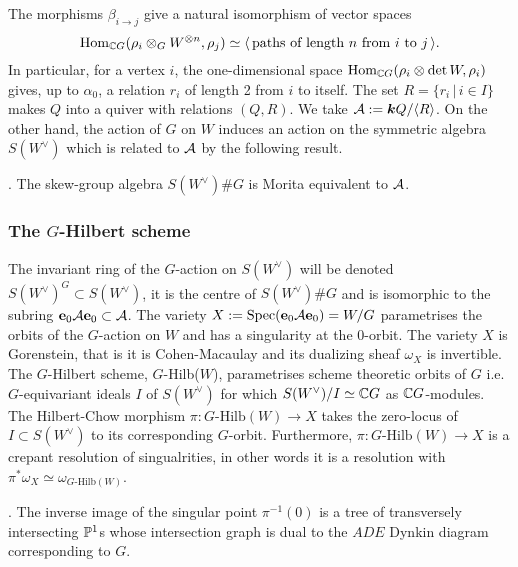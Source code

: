 \documentclass{amsart}
\theoremstyle{definition}
\newcommand\W{W}
\begin{document}

The morphisms $\beta_{i \rightarrow j}$ give a natural isomorphism of vector spaces $$\Hom_{\bC G}(\rho_i \otimes_G \W^{\otimes n}, \rho_j) \simeq \langle\, \text{paths of length }n \text{ from }i \text{ to } j\,\rangle.$$
In particular, for a vertex $i$, the one-dimensional space $\Hom_{\bC G} (\rho_i \otimes \det \W, \rho_i)$ gives, up to $\alpha_0$, a relation $r_i$ of length 2 from $i$ to itself.
The set $R = \{r_i \, |\, i \in I\}$ makes $Q$ into a quiver with relations $(Q, R)$. 
We take $\mathcal{A}:= {\boldsymbol{k}} Q/ \langle R\rangle$.
On the other hand, the action of $G$ on $\W$ induces an action on the symmetric algebra $S(W^\vee)$ which is related to $\mathcal{A}$ by the following result.

\begin{theorem}\cite{MR2593679}.
The skew-group algebra $S(W^\vee) \# G$ is Morita equivalent to $\mathcal{A}$.
\end{theorem}

\subsubsection{The $G$-Hilbert scheme}

The invariant ring of the $G$-action on $S(W^\vee)$ will be denoted $S(W^\vee)^G \subset S(W^\vee)$, it is the centre of $S(W^\vee) \# G$ and is isomorphic to the subring $\mathbf{e}_0 \mathcal{A} \mathbf{e}_0 \subset \mathcal{A}$.
The variety $X:= \Spec(\bfe_0 \cA \bfe_0)=\W/G$ parametrises the orbits of the $G$-action on $\W$ and has a singularity at the $0$-orbit.
The variety $X$ is Gorenstein, that is it is Cohen-Macaulay and its dualizing sheaf $\omega_X$ is invertible.
The $G$-Hilbert scheme, $G$-Hilb($\W$), parametrises scheme theoretic orbits of $G$ i.e.\ $G$-equivariant ideals $I$ of $S(W^\vee)$ for which $S(W^\vee)/I \simeq \mathbb{C} G$ as $\mathbb{C} G$-modules.
The Hilbert-Chow morphism $\pi \colon G\text{-Hilb}(\W) \rightarrow X$ takes the zero-locus of $I \subset S(W^\vee)$ to its corresponding $G$-orbit.
Furthermore, $\pi \colon G\text{-Hilb}(\W) \rightarrow X$ is a crepant resolution of singualrities, in other words it is a resolution with $\pi^*\omega_X \simeq \omega_{G\text{-Hilb}(\W)}$.

\begin{theorem}\cite{MR604577}.
The inverse image of the singular point $\pi^{-1}(0)$ is a tree of transversely intersecting $\mathbb{P}^1$s whose intersection graph is dual to the $ADE$ Dynkin diagram corresponding to $G$.
\end{theorem}
\end{document}

